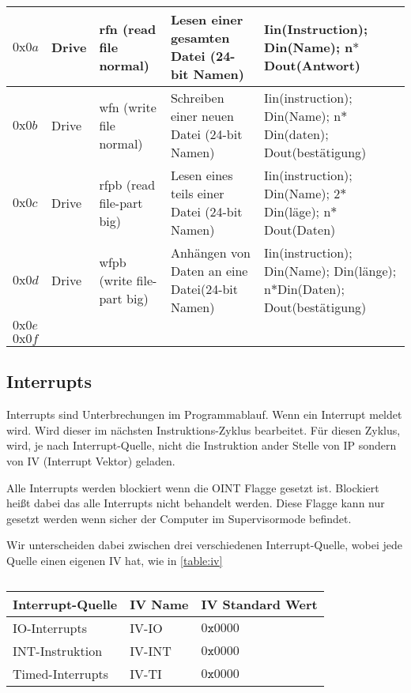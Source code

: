 \documentclass{scrartcl}
\begin{document}
\begin{center}
\begin{table}[h]
\begin{tabular}{p{} | p{} | p{} | p{} | p{}}
			\hline
			 $0\text{x}0a$ & Drive & rfn (read file normal) & Lesen einer gesamten Datei (24-bit Namen)  & Iin(Instruction); Din(Name); n$*$Dout(Antwort) \\
			\hline
			 $0\text{x}0b$ & Drive & wfn (write file normal) & Schreiben einer neuen Datei (24-bit Namen) & Iin(instruction); Din(Name); n$*$Din(daten); Dout(bestätigung) \\
			\hline
			 $0\text{x}0c$ & Drive & rfpb (read file-part big) & Lesen eines teils einer Datei (24-bit Namen) & Iin(instruction); Din(Name); 2$*$Din(läge); n$*$Dout(Daten) \\
			\hline
			 $0\text{x}0d$ & Drive & wfpb (write file-part big) & Anhängen von Daten an eine Datei(24-bit Namen) & Iin(instruction); Din(Name); Din(länge); n$*$Din(Daten); Dout(bestätigung) \\
			\hline
			 $0\text{x}0e$ &  & & & \\
			\hline
			 $0\text{x}0f$ &  & & &
		\end{tabular}
	\end{table}
\end{center}

\subsection{\label{section:interrupts}Interrupts}

Interrupts sind Unterbrechungen im Programmablauf. Wenn ein Interrupt meldet wird. Wird dieser im nächsten Instruktions-Zyklus bearbeitet. Für diesen Zyklus, wird, je nach Interrupt-Quelle, nicht die Instruktion ander Stelle von IP sondern von IV (Interrupt Vektor) geladen.

Alle Interrupts werden blockiert wenn die OINT Flagge gesetzt ist. Blockiert heißt dabei das alle Interrupts nicht behandelt werden. Diese Flagge kann nur gesetzt werden wenn sicher der Computer im Supervisormode befindet.

Wir unterscheiden dabei zwischen drei verschiedenen Interrupt-Quelle, wobei jede Quelle einen eigenen IV hat, wie in \autoref{table:iv}

\begin{center}	
	\begin{table}[h]
		\caption{\label{table:iv}}
		\begin{tabular}{l | l l}
			Interrupt-Quelle & IV Name & IV Standard Wert \\
			\hline
			IO-Interrupts & IV-IO & $0\texttt{x}0000$ \\
			INT-Instruktion & IV-INT & $0\texttt{x}0000$ \\
			Timed-Interrupts & IV-TI & $0\texttt{x}0000$ \\
		\end{tabular}
	\end{table}
\end{center}
\end{document}
